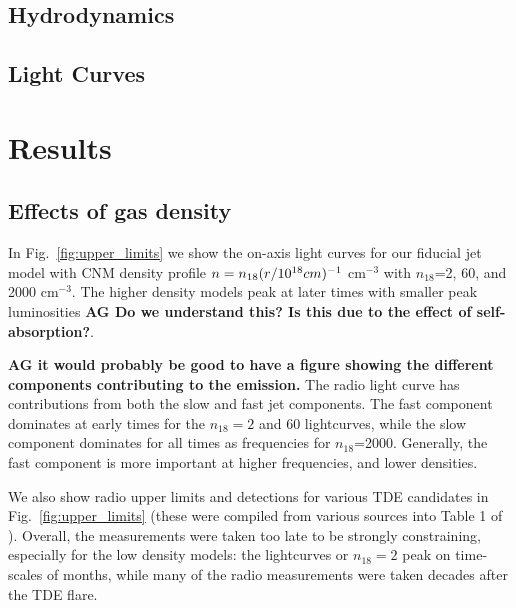 \documentclass[usenatbib,fleqn]{mn2e}
\begin{document}
\subsection{Hydrodynamics}

\subsection{Light Curves}


\section{Results}
\label{sec:results}

\subsection{Effects of gas density}

In Fig.~\ref{fig:upper_limits} we show the on-axis light curves for
our fiducial jet model with CNM density profile $n=n_{18} (r/10^{18}
{\rm} cm)^{-1}$ cm$^{-3}$ with $n_{18}$=2, 60, and 2000 cm$^{-3}$. The
higher density models peak at later times with smaller peak
luminosities {\bf AG Do we understand this? Is this due to the effect
  of self-absorption?}.

{\bf AG it would probably be good to have a figure showing the
  different components contributing to the emission.} The radio light
curve has contributions from both the slow and fast jet
components. The fast component dominates at
early times for the $n_{18}=2$ and 60 lightcurves, while the slow
component dominates for all times as frequencies for
$n_{18}$=2000. Generally, the fast component is more important at
higher frequencies, and lower densities.

We also show radio upper limits and detections for various TDE
candidates in Fig.~\ref{fig:upper_limits} (these were compiled from
various sources into Table 1 of \citealt{Mimica+2015}). Overall, the
measurements were taken too late to be strongly constraining,
especially for the low density models: the lightcurves or $n_{18}=2$
peak on time-scales of months, while many of the radio measurements
were taken decades after the TDE flare.
\end{document}
